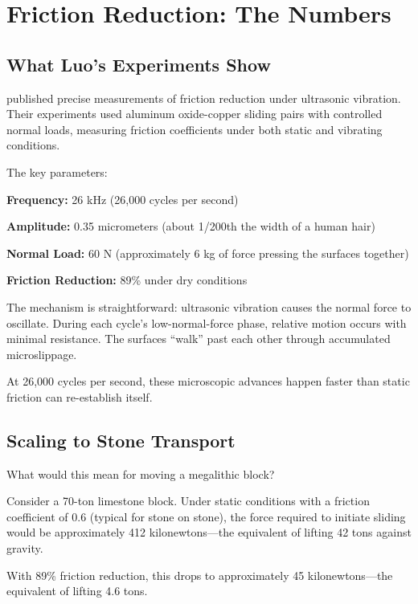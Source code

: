 \documentclass[11pt]{article}
\begin{document}
\section{Friction Reduction: The Numbers}

\subsection{What Luo's Experiments Show}

\citet{Luo2024} published precise measurements of friction reduction under ultrasonic vibration. Their experiments used aluminum oxide-copper sliding pairs with controlled normal loads, measuring friction coefficients under both static and vibrating conditions.

The key parameters:

\textbf{Frequency:} 26 kHz (26,000 cycles per second)

\textbf{Amplitude:} 0.35 micrometers (about 1/200th the width of a human hair)

\textbf{Normal Load:} 60 N (approximately 6 kg of force pressing the surfaces together)

\textbf{Friction Reduction:} 89\% under dry conditions

The mechanism is straightforward: ultrasonic vibration causes the normal force to oscillate. During each cycle's low-normal-force phase, relative motion occurs with minimal resistance. The surfaces ``walk'' past each other through accumulated microslippage.

At 26,000 cycles per second, these microscopic advances happen faster than static friction can re-establish itself.

\subsection{Scaling to Stone Transport}

What would this mean for moving a megalithic block?

Consider a 70-ton limestone block. Under static conditions with a friction coefficient of 0.6 (typical for stone on stone), the force required to initiate sliding would be approximately 412 kilonewtons---the equivalent of lifting 42 tons against gravity.

With 89\% friction reduction, this drops to approximately 45 kilonewtons---the equivalent of lifting 4.6 tons.
\end{document}

